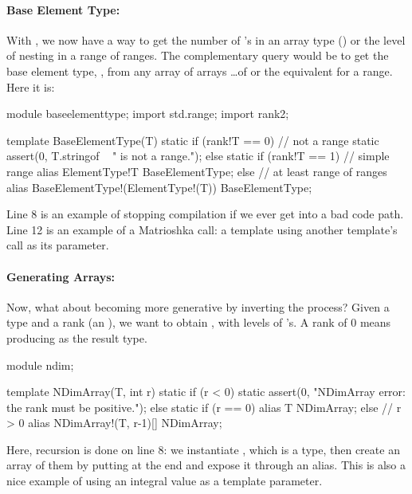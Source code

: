 \paragraph{Base Element Type:}

With , we now have a way to get the number of \DD{[]}'s in an array type () or the level of nesting in a range of ranges. The complementary query would be to get the base element type, , from any array of arrays \ldots of  or the equivalent for a range. Here it is:

\begin{ndcode}
module baseelementtype;
import std.range;
import rank2;

template BaseElementType(T)
{
    static if (rank!T == 0)      // not a range
        static assert(0, T.stringof ~ " is not a range.");
    else static if (rank!T == 1) // simple range
        alias ElementType!T                     BaseElementType;
    else                         // at least range of ranges
        alias BaseElementType!(ElementType!(T)) BaseElementType;
}        
\end{ndcode}

Line 8 is an example of  stopping compilation if we ever get into a bad code path. Line 12 is an example of a Matrioshka call: a template using another template's call as its parameter.

\paragraph{Generating Arrays:}

Now, what about becoming more generative by inverting the process? Given a type  and a rank  (an ), we want to obtain , with  levels of \DD{[]}'s. A rank of 0 means producing  as the result type.

\begin{ndcode}
module ndim;

template NDimArray(T, int r)
{
    static if (r < 0)
        static assert(0, "NDimArray error: the rank must be positive.");
    else static if (r == 0)
        alias T NDimArray;
    else // r > 0
        alias NDimArray!(T, r-1)[] NDimArray;
}
\end{ndcode}

Here, recursion is done on line 8: we instantiate , which is a type, then create an array of them by putting \DD{[]} at the end and expose it through an alias. This is also a nice example of using an integral value as a template parameter.

